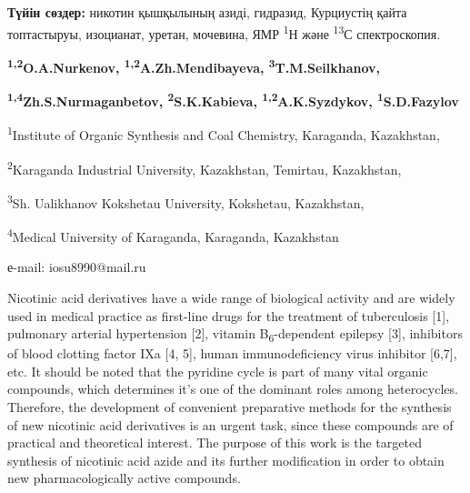 {\bfseries Түйін сөздер:} никотин қышқылының азиді, гидразид, Курциустің
қайта топтастыруы, изоцианат, уретан, мочевина, ЯМР \textsuperscript{1}Н
және \textsuperscript{13}С спектроскопия.


\begin{center}
{\bfseries \textsuperscript{1,2}O.A.Nurkenov,
\textsuperscript{1,2}A.Zh.Mendibayeva,
\textsuperscript{3}T.M.Seilkhanov,}

{\bfseries \textsuperscript{1,4}Zh.S.Nurmaganbetov,
\textsuperscript{2}S.K.Kabieva, \textsuperscript{1,2}A.K.Syzdykov,
\textsuperscript{1}S.D.Fazylov}

\textsuperscript{1}Institute of Organic Synthesis and Coal Chemistry,
Karaganda, Kazakhstan,

\textsuperscript{2}Karaganda Industrial University, Kazakhstan,
Temirtau, Kazakhstan,

\textsuperscript{3}Sh. Ualikhanov Kokshetau University, Kokshetau,
Kazakhstan,

\textsuperscript{4}Medical University of Karaganda, Karaganda,
Kazakhstan

е-mail: iosu8990@mail.ru
\end{center}

Nicotinic acid derivatives have a wide range of biological activity and
are widely used in medical practice as first-line drugs for the
treatment of tuberculosis {[}1{]}, pulmonary arterial hypertension
{[}2{]}, vitamin B\textsubscript{6}-dependent epilepsy {[}3{]},
inhibitors of blood clotting factor IXa {[}4, 5{]}, human
immunodeficiency virus inhibitor {[}6,7{]}, etc. It should be noted that
the pyridine cycle is part of many vital organic compounds, which
determines it's one of the dominant roles among heterocycles. Therefore,
the development of convenient preparative methods for the synthesis of
new nicotinic acid derivatives is an urgent task, since these compounds
are of practical and theoretical interest. The purpose of this work is
the targeted synthesis of nicotinic acid azide and its further
modification in order to obtain new pharmacologically active compounds.

